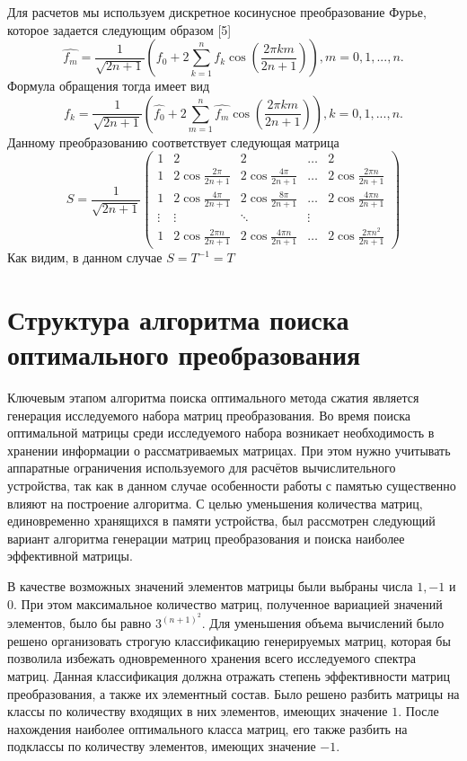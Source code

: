 \documentclass[11pt, oneside, a4paper]{article}
\begin{document}
Для расчетов мы используем дискретное косинусное преобразование Фурье, которое задается следующим образом [5]
\begin{equation}
\label{DCT}
\hat{f_m}=\frac{1}{\sqrt{2n+1}}(f_0+2\sum\limits_{k=1}^{n}f_k\cos(\frac{2 \pi k m}{2n+1})), m=0,1,...,n.
\end{equation}
Формула обращения тогда имеет вид
\begin{equation}
\label{inverseDCT}
f_k=\frac{1}{\sqrt{2n+1}}(\hat{f_0}+2\sum\limits_{m=1}^{n}\hat{f_m}\cos(\frac{2 \pi k m}{2n+1})), k=0,1,...,n.
\end{equation}
Данному преобразованию соответствует следующая матрица
\begin{equation}
\label{matrixDCT}
S = \frac{1}{\sqrt{2n+1}}\begin{pmatrix}
1 & 2 & 2 & \ldots & 2\\
1 & 2\cos\frac{2 \pi}{2n+1} & 2\cos\frac{4 \pi}{2n+1} & \ldots & 2\cos\frac{2 \pi n}{2n+1}\\
1 & 2\cos\frac{4 \pi}{2n+1} & 2\cos\frac{8 \pi}{2n+1} & \ldots & 2\cos\frac{4 \pi n}{2n+1}\\
\vdots & \vdots & \ddots & \vdots\\
1 & 2\cos\frac{2 \pi n}{2n+1} & 2\cos\frac{4 \pi n}{2n+1} & \ldots & 2\cos\frac{2 \pi n^2}{2n+1}
\end{pmatrix}
\end{equation}
Как видим, в данном случае $S=T^{-1}=T$

\section{Структура алгоритма поиска оптимального преобразования}

Ключевым этапом алгоритма поиска оптимального метода сжатия является генерация исследуемого набора матриц преобразования. Во время поиска оптимальной матрицы среди исследуемого набора возникает необходимость в хранении информации о рассматриваемых матрицах. При этом нужно                   учитывать аппаратные ограничения используемого для расчётов вычислительного устройства, так как в данном случае особенности работы с памятью существенно влияют на построение алгоритма. С целью уменьшения количества матриц, единовременно хранящихся в памяти устройства, был рассмотрен следующий вариант алгоритма генерации матриц преобразования и поиска наиболее эффективной матрицы.

В качестве возможных значений элементов матрицы были выбраны числа $1, -1$ и $0$. При этом максимальное количество матриц, полученное вариацией значений элементов, было бы равно $3^{(n+1)^2}$. Для уменьшения объема вычислений было решено организовать строгую классификацию генерируемых матриц, которая бы позволила избежать одновременного хранения всего исследуемого спектра матриц. Данная классификация должна отражать степень эффективности матриц преобразования, а также их элементный состав. Было решено разбить матрицы на классы по количеству входящих в них элементов, имеющих значение $1$. После нахождения наиболее оптимального класса матриц, его также разбить на подклассы по количеству элементов, имеющих значение $-1$.
\end{document}
